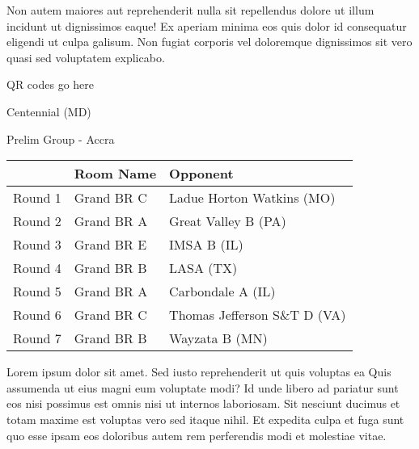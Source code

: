 \documentclass{article}%
\begin{document}
\newline%
Non autem maiores aut reprehenderit nulla sit repellendus dolore ut illum incidunt ut dignissimos eaque! Ex aperiam minima eos quis dolor id consequatur eligendi ut culpa galisum. Non fugiat corporis vel doloremque dignissimos sit vero quasi sed voluptatem explicabo.\newline%
\newline%
%
\vspace*{30pt}%
\begin{center}%
\begin{Huge}%
QR codes go here%
\end{Huge}%
\end{center}%
\newpage%
%
\begin{center}%
\begin{Huge}%
Centennial (MD)%
\end{Huge}%
\vspace*{8pt}%
\linebreak%
\begin{Large}%
Prelim Group {-} Accra%
\end{Large}%
\end{center}%
\begin{tabularx}{\textwidth}{|c|Y|Y|}%
\hline%
&Room Name&Opponent\\%
\hline%
Round 1&Grand BR C&Ladue Horton Watkins (MO)\\%
Round 2&Grand BR A&Great Valley B (PA)\\%
Round 3&Grand BR E&IMSA B (IL)\\%
Round 4&Grand BR B&LASA (TX)\\%
Round 5&Grand BR A&Carbondale A (IL)\\%
Round 6&Grand BR C&Thomas Jefferson S\&T D (VA)\\%
Round 7&Grand BR B&Wayzata B (MN)\\%
\hline%
\end{tabularx}%
\vspace*{8pt}%
\linebreak%
\newline%
\newline%
Lorem ipsum dolor sit amet. Sed iusto reprehenderit ut quis voluptas ea Quis assumenda ut eius magni eum voluptate modi? Id unde libero ad pariatur sunt eos nisi possimus est omnis nisi ut internos laboriosam. Sit nesciunt ducimus et totam maxime est voluptas vero sed itaque nihil. Et expedita culpa et fuga sunt quo esse ipsam eos doloribus autem rem perferendis modi et molestiae vitae.\newline%
\end{document}
